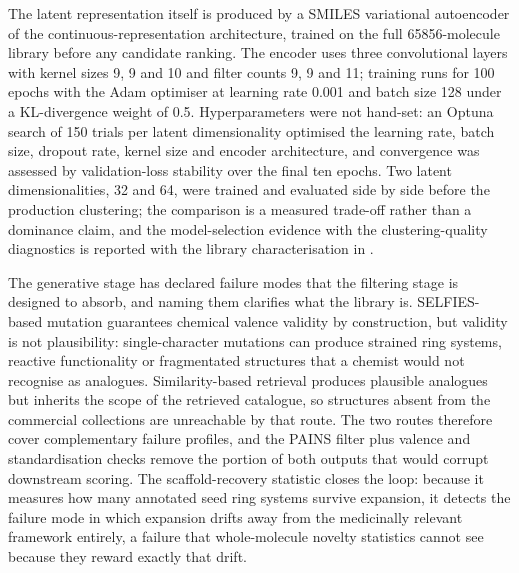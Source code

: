The latent representation itself is produced by a SMILES variational autoencoder of the continuous-representation architecture\cite{gomez2018automatic}, trained on the full \num{65856}-molecule library before any candidate ranking. The encoder uses three convolutional layers with kernel sizes \num{9}, \num{9} and \num{10} and filter counts \num{9}, \num{9} and \num{11}; training runs for \num{100} epochs with the Adam optimiser at learning rate \num{0.001} and batch size \num{128} under a KL-divergence weight of \num{0.5}. Hyperparameters were not hand-set: an Optuna search of \num{150} trials per latent dimensionality\cite{Akiba2019} optimised the learning rate, batch size, dropout rate, kernel size and encoder architecture, and convergence was assessed by validation-loss stability over the final ten epochs. Two latent dimensionalities, \num{32} and \num{64}, were trained and evaluated side by side before the production clustering; the comparison is a measured trade-off rather than a dominance claim, and the model-selection evidence with the clustering-quality diagnostics is reported with the library characterisation in .

The generative stage has declared failure modes that the filtering stage is designed to absorb, and naming them clarifies what the library is. SELFIES-based mutation guarantees chemical valence validity by construction, but validity is not plausibility: single-character mutations can produce strained ring systems, reactive functionality or fragmentated structures that a chemist would not recognise as analogues. Similarity-based retrieval produces plausible analogues but inherits the scope of the retrieved catalogue, so structures absent from the commercial collections are unreachable by that route. The two routes therefore cover complementary failure profiles, and the PAINS filter plus valence and standardisation checks remove the portion of both outputs that would corrupt downstream scoring. The scaffold-recovery statistic closes the loop: because it measures how many annotated seed ring systems survive expansion, it detects the failure mode in which expansion drifts away from the medicinally relevant framework entirely, a failure that whole-molecule novelty statistics cannot see because they reward exactly that drift.

